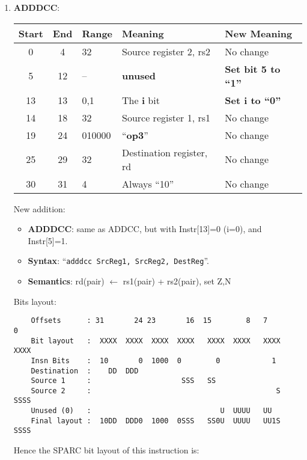 \begin{enumerate}
\item \textbf{ADDDCC}:\\
  \begin{center}
    \begin{tabular}[p]{|c|c|l|l|l|}
      \hline
      \textbf{Start} & \textbf{End} & \textbf{Range} & \textbf{Meaning} &
                                                                          \textbf{New Meaning}\\
      \hline
      0 & 4 & 32 & Source register 2, rs2 & No change \\
      5 & 12 & -- & \textbf{unused} & \textbf{Set bit 5 to ``1''} \\
      13 & 13 & 0,1 & The \textbf{i} bit & \textbf{Set i to ``0''} \\
      14 & 18 & 32 & Source register 1, rs1 & No change \\
      19 & 24 & 010000 & ``\textbf{op3}'' & No change \\
      25 & 29 & 32 & Destination register, rd & No change \\
      30 & 31 & 4 & Always ``10'' & No change \\
      \hline
    \end{tabular}
  \end{center}
  New addition:
  \begin{itemize}
  \item []\textbf{ADDDCC}: same as ADDCC, but with Instr[13]=0 (i=0), and
    Instr[5]=1.
  \item []\textbf{Syntax}: ``\texttt{adddcc  SrcReg1, SrcReg2, DestReg}''.
  \item []\textbf{Semantics}: rd(pair) $\leftarrow$ rs1(pair) + rs2(pair), set Z,N
  \end{itemize}
  Bits layout:
\begin{verbatim}
    Offsets      : 31       24 23       16  15        8   7        0
    Bit layout   :  XXXX  XXXX  XXXX  XXXX   XXXX  XXXX   XXXX  XXXX
    Insn Bits    :  10       0  1000  0        0            1       
    Destination  :    DD  DDD                                       
    Source 1     :                     SSS   SS
    Source 2     :                                           S  SSSS
    Unused (0)   :                              U  UUUU   UU        
    Final layout :  10DD  DDD0  1000  0SSS   SS0U  UUUU   UU1S  SSSS
\end{verbatim}

  Hence the SPARC bit layout of this instruction is:


\end{enumerate}
